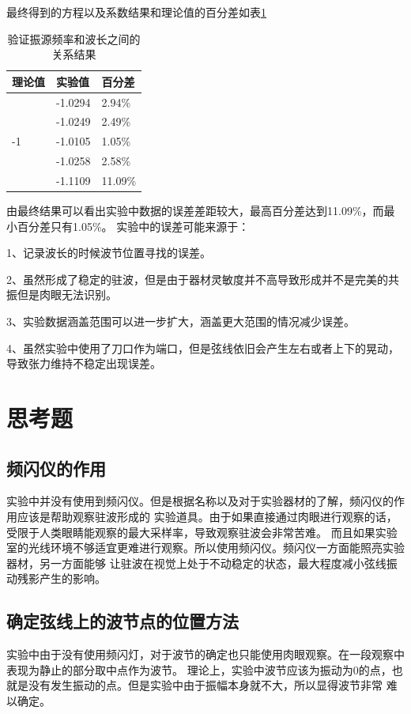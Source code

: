 \documentclass{ctexart}
\begin{document}
  最终得到的方程以及系数结果和理论值的百分差如表\ref{yanzhengpinlvbaifencha}
  \begin{table}[h]
    \centering   
    \caption{验证振源频率和波长之间的关系结果}\label{yanzhengpinlvbaifencha}
    \begin{tabular}{| l || l || l |}
        \hline
        理论值 & 实验值 & 百分差\\
        \hline
        \multirow{5}{*}{-1} & -1.0294 & 2.94\% \\
        \cline{2-3}
        & -1.0249 & 2.49\% \\
        \cline{2-3}
        & -1.0105 & 1.05\% \\
        \cline{2-3}
        & -1.0258 & 2.58\% \\
        \cline{2-3}
        & -1.1109 & 11.09\% \\
        \hline                   
    \end{tabular}
  \end{table}

  由最终结果可以看出实验中数据的误差差距较大，最高百分差达到11.09\%，而最小百分差只有1.05\%。
  实验中的误差可能来源于：

  1、记录波长的时候波节位置寻找的误差。

  2、虽然形成了稳定的驻波，但是由于器材灵敏度并不高导致形成并不是完美的共振但是肉眼无法识别。

  3、实验数据涵盖范围可以进一步扩大，涵盖更大范围的情况减少误差。

  4、虽然实验中使用了刀口作为端口，但是弦线依旧会产生左右或者上下的晃动，导致张力维持不稳定出现误差。
\newpage

\section{思考题}
  \subsection{频闪仪的作用}
  实验中并没有使用到频闪仪。但是根据名称以及对于实验器材的了解，频闪仪的作用应该是帮助观察驻波形成的
  实验道具。由于如果直接通过肉眼进行观察的话，受限于人类眼睛能观察的最大采样率，导致观察驻波会非常苦难。
  而且如果实验室的光线环境不够适宜更难进行观察。所以使用频闪仪。频闪仪一方面能照亮实验器材，另一方面能够
  让驻波在视觉上处于不动稳定的状态，最大程度减小弦线振动残影产生的影响。

  \subsection{确定弦线上的波节点的位置方法}
  实验中由于没有使用频闪灯，对于波节的确定也只能使用肉眼观察。在一段观察中表现为静止的部分取中点作为波节。
  理论上，实验中波节应该为振动为0的点，也就是没有发生振动的点。但是实验中由于振幅本身就不大，所以显得波节非常
  难以确定。
\end{document}

